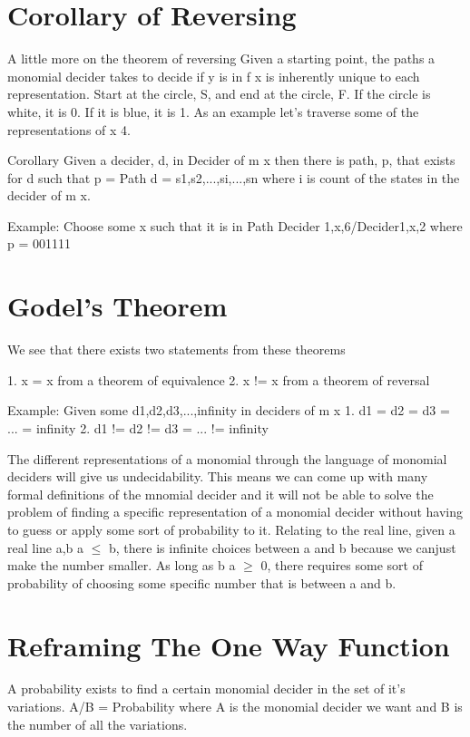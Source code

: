 \section{Corollary of Reversing}

A little more on the theorem of reversing
Given a starting point, the paths a monomial decider takes to decide if y is in f x is inherently unique to each representation. Start at the circle, S, and end at the circle, F. If the circle is white, it is 0. If it is blue, it is 1. As an example let's traverse some of the representations of x 4.

Corollary
Given a decider, d, in Decider of m x then there is path, p, that exists for d such that p = Path d = s1,s2,...,si,...,sn where i is count of the states in the decider of m x.

Example:
Choose some x such that it is in Path Decider 1,x,6/Decider1,x,2 where p = 001111

\section{Godel's Theorem}

We see that there exists two statements from these theorems

1. x = x from a theorem of equivalence
2. x != x from a theorem of reversal


Example:
Given some d1,d2,d3,...,infinity in deciders of m x
1. d1 = d2 = d3 = ... = infinity
2. d1 != d2 != d3 = ... != infinity

The different representations of a monomial through the language of monomial deciders will give us undecidability. This means we can come up with many formal definitions of the mnomial decider and it will not be able to solve the problem of finding a specific representation of a monomial decider without having to guess or apply some sort of probability to it. Relating to the real line, given a real line a,b a $\leq$ b, there is infinite choices between a and b because we canjust make the number smaller. As long as b  a $\geq $ 0, there requires some sort of probability of choosing some specific number that is between a and b.

\section{Reframing The One Way Function}

A probability exists to find a certain monomial decider in the set of it's variations. A/B = Probability where A is the monomial decider we want and B is the number of all the variations.

